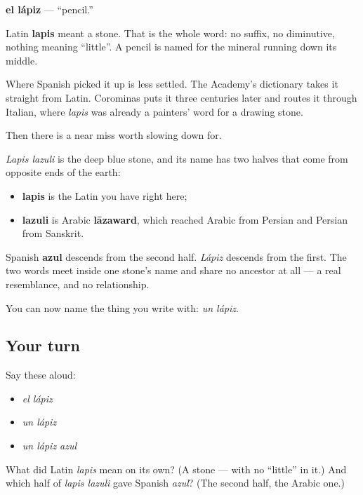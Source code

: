 \begin{cousinweb}
\textbf{el lápiz} — \textquotedblleft{}pencil.\textquotedblright{}

Latin \textbf{lapis} meant a stone. That is the whole word: no suffix, no diminutive, nothing meaning \textquotedblleft{}little\textquotedblright{}. A pencil is named for the mineral running down its middle.

Where Spanish picked it up is less settled. The Academy's dictionary takes it straight from Latin. Corominas puts it three centuries later and routes it through Italian, where \emph{lapis} was already a painters' word for a drawing stone.

Then there is a near miss worth slowing down for.

\emph{Lapis lazuli} is the deep blue stone, and its name has two halves that come from opposite ends of the earth:

\begin{itemize}
\raggedright
  \item \textbf{lapis} is the Latin you have right here;
  \item \textbf{lazuli} is Arabic \textbf{lāzaward}, which reached Arabic from Persian and Persian from Sanskrit.
\end{itemize}

Spanish \textbf{azul} descends from the second half. \emph{Lápiz} descends from the first. The two words meet inside one stone's name and share no ancestor at all — a real resemblance, and no relationship.
\end{cousinweb}

\begin{grammarlens}[title={What you've built}]
You can now name the thing you write with: \emph{un lápiz}.
\end{grammarlens}

\subsection*{Your turn}
Say these aloud:

\begin{itemize}
\raggedright
  \item \emph{el lápiz}
  \item \emph{un lápiz}
  \item \emph{un lápiz azul}
\end{itemize}

\begin{tcolorbox}[breakable,colback=teal!4,colframe=teal!35!black,title={Before you move on}]
What did Latin \emph{lapis} mean on its own? (A stone — with no \textquotedblleft{}little\textquotedblright{} in it.) And which half of \emph{lapis lazuli} gave Spanish \emph{azul}? (The second half, the Arabic one.)
\end{tcolorbox}
